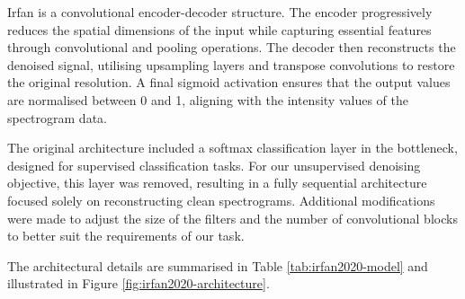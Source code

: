 Irfan is a convolutional encoder-decoder structure. The encoder progressively reduces the spatial dimensions of the input while capturing essential features through convolutional and pooling operations. The decoder then reconstructs the denoised signal, utilising upsampling layers and transpose convolutions to restore the original resolution. A final sigmoid activation ensures that the output values are normalised between 0 and 1, aligning with the intensity values of the spectrogram data.

The original architecture included a softmax classification layer in the bottleneck, designed for supervised classification tasks. For our unsupervised denoising objective, this layer was removed, resulting in a fully sequential architecture focused solely on reconstructing clean spectrograms. Additional modifications were made to adjust the size of the filters and the number of convolutional blocks to better suit the requirements of our task.

The architectural details are summarised in Table \ref{tab:irfan2020-model} and illustrated in Figure \ref{fig:irfan2020-architecture}.

